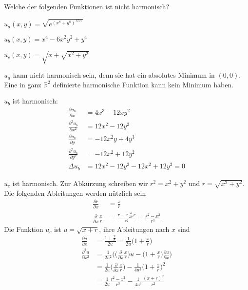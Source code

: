 Welche der folgenden Funktionen ist nicht harmonisch?
\begin{teilaufgaben}
\item $u_a(x,y)=\sqrt{e^{(x^8+y^8)^{1291}}}$
\item $u_b(x,y)=x^4-6x^2y^2+y^4$
\item $u_c(x,y)=\sqrt{x+\sqrt{x^2+y^2}}$
\end{teilaufgaben}

\begin{loesung}
\begin{teilaufgaben}
\item $u_a$ kann nicht harmonisch sein, denn sie hat
ein absolutes Minimum in $(0,0)$. Eine in ganz $\mathbb R^2$ definierte
harmonische Funktion kann kein Minimum haben.
\item $u_b$ ist harmonisch:
\begin{align*}
\frac{\partial u_b}{\partial x}
&= 4x^3-12xy^2\\
\frac{\partial^2 u_b}{\partial x^2}
&= 12x^2-12y^2\\
\frac{\partial u_b}{\partial y}
&= -12x^2y+4y^3\\
\frac{\partial^2 u_b}{\partial y^2}
&= -12x^2+12y^2
\\
\Delta u_b&=
 12x^2-12y^2
 -12x^2+12y^2
=0
\end{align*}
\item $u_c$ ist harmonisch. Zur Abkürzung schreiben wir
$r^2=x^2+y^2$ und $r=\sqrt{x^2 + y^2}$. Die folgenden
Ableitungen werden nützlich sein
\begin{align*}
\frac{\partial r}{\partial x}&=\frac{x}{r}
\\
\frac{\partial }{\partial x}\frac{x}{r}
&=
\frac{r-x\frac{\partial}{\partial x}r}{r^2}
=\frac{r^2-x^2}{r^3}
\end{align*}
Die Funktion $u_c$ ist $u=\sqrt{x+r}$, ihre Ableitungen nach $x$ sind
\begin{align*}
\frac{\partial u}{\partial x}
&=
\frac{1+\frac{x}r}{2u}
=\frac1{2u}\biggl(1+\frac{x}r\biggr)
\\
\frac{\partial^2u}{\partial x^2}
&=
\frac1{2u^2}\biggl(
\biggl(
\frac{\partial }{\partial x}\frac{x}r
\biggr)u
-\biggl(1+\frac{x}{r}\biggr)\frac{\partial u}{\partial x}\biggr)
\\
&=
\frac1{2u}
\biggl(
\frac{\partial }{\partial x}\frac{x}r
\biggr)
-
\frac1{4u^3}
\biggl(1+\frac{x}{r}\biggr)^2
\\
&=
\frac1{2u}\frac{r^2-x^2}{r^3}
-
\frac1{4u^3}
\frac{(x+r)^2}{r^2}
\end{align*}

\end{teilaufgaben}
\end{loesung}
